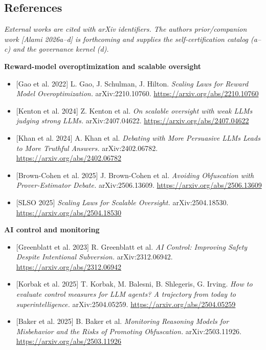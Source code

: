 \documentclass[11pt]{article}
\providecommand{\tightlist}{\setlength{\itemsep}{0pt}\setlength{\parskip}{0pt}}
\begin{document}
\subsection{References}\label{references}

\emph{External works are cited with arXiv identifiers. The
author\textquotesingle s prior/companion work {[}Alami 2026a--d{]} is
forthcoming and supplies the self-certification catalog (a--c) and the
governance kernel (d).}

\textbf{Reward-model overoptimization and scalable oversight}

\begin{itemize}
\tightlist
\item
  {[}Gao et al. 2022{]} L. Gao, J. Schulman, J. Hilton. \emph{Scaling
  Laws for Reward Model Overoptimization.} arXiv:2210.10760.
  \url{https://arxiv.org/abs/2210.10760}
\item
  {[}Kenton et al. 2024{]} Z. Kenton et al. \emph{On scalable oversight
  with weak LLMs judging strong LLMs.} arXiv:2407.04622.
  \url{https://arxiv.org/abs/2407.04622}
\item
  {[}Khan et al. 2024{]} A. Khan et al. \emph{Debating with More
  Persuasive LLMs Leads to More Truthful Answers.} arXiv:2402.06782.
  \url{https://arxiv.org/abs/2402.06782}
\item
  {[}Brown-Cohen et al. 2025{]} J. Brown-Cohen et al. \emph{Avoiding
  Obfuscation with Prover-Estimator Debate.} arXiv:2506.13609.
  \url{https://arxiv.org/abs/2506.13609}
\item
  {[}SLSO 2025{]} \emph{Scaling Laws for Scalable Oversight.}
  arXiv:2504.18530. \url{https://arxiv.org/abs/2504.18530}
\end{itemize}

\textbf{AI control and monitoring}

\begin{itemize}
\tightlist
\item
  {[}Greenblatt et al. 2023{]} R. Greenblatt et al. \emph{AI Control:
  Improving Safety Despite Intentional Subversion.} arXiv:2312.06942.
  \url{https://arxiv.org/abs/2312.06942}
\item
  {[}Korbak et al. 2025{]} T. Korbak, M. Balesni, B. Shlegeris, G.
  Irving. \emph{How to evaluate control measures for LLM agents? A
  trajectory from today to superintelligence.} arXiv:2504.05259.
  \url{https://arxiv.org/abs/2504.05259}
\item
  {[}Baker et al. 2025{]} B. Baker et al. \emph{Monitoring Reasoning
  Models for Misbehavior and the Risks of Promoting Obfuscation.}
  arXiv:2503.11926. \url{https://arxiv.org/abs/2503.11926}
\end{itemize}
\end{document}
